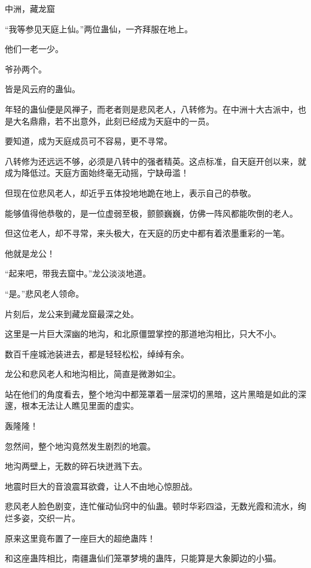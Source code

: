 
\begin{this_body}



中洲，藏龙窟

“我等参见天庭上仙。”两位蛊仙，一齐拜服在地上。

他们一老一少。

爷孙两个。

皆是风云府的蛊仙。

年轻的蛊仙便是风禅子，而老者则是悲风老人，八转修为。在中洲十大古派中，也是大名鼎鼎，若不出意外，此刻已经成为天庭中的一员。

要知道，成为天庭成员可不容易，更不寻常。

八转修为还远远不够，必须是八转中的强者精英。这点标准，自天庭开创以来，就成为降低过。天庭方面始终毫无动摇，宁缺毋滥！

但现在位悲风老人，却近乎五体投地地跪在地上，表示自己的恭敬。

能够值得他恭敬的，是一位虚弱至极，颤颤巍巍，仿佛一阵风都能吹倒的老人。

但这位老人，却不寻常，来头极大，在天庭的历史中都有着浓墨重彩的一笔。

他就是龙公！

“起来吧，带我去窟中。”龙公淡淡地道。

“是。”悲风老人领命。

片刻后，龙公来到藏龙窟最深之处。

这里是一片巨大深幽的地沟，和北原僵盟掌控的那道地沟相比，只大不小。

数百千座城池装进去，都是轻轻松松，绰绰有余。

龙公和悲风老人和地沟相比，简直是微渺如尘。

站在他们的角度看去，整个地沟中都笼罩着一层深切的黑暗，这片黑暗是如此的深邃，根本无法让人瞧见里面的虚实。

轰隆隆！

忽然间，整个地沟竟然发生剧烈的地震。

地沟两壁上，无数的碎石块迸溅下去。

地震时巨大的音浪震耳欲聋，让人不由地心惊胆战。

悲风老人脸色剧变，连忙催动仙窍中的仙蛊。顿时华彩四溢，无数光霞和流水，绚烂多姿，交织一片。

原来这里竟布置了一座巨大的超绝蛊阵！

和这座蛊阵相比，南疆蛊仙们笼罩梦境的蛊阵，只能算是大象脚边的小猫。


\end{this_body}
